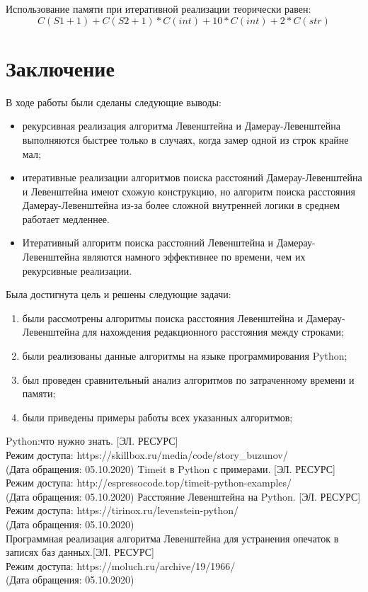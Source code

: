 \documentclass[a4paper]{article}
\begin{document}
	Использование памяти при итеративной реализации теорически равен:
	\begin{equation}
		C(S1+1) + C(S2+1) * C(int) + 10*C(int) + 2*C(str)
		\label{pamyat2}
	\end{equation}
	\clearpage
	\section*{Заключение} В ходе работы были сделаны следующие выводы:
	\begin{itemize}
		\item рекурсивная реализация алгоритма Левенштейна и Дамерау-Левенштейна выполняются быстрее только в случаях, когда замер одной из строк крайне мал;
		\item  итеративные реализации алгоритмов поиска расстояний Дамерау-Левенштейна и Левенштейна имеют схожую конструкцию, но алгоритм поиска расстояния Дамерау-Левенштейна из-за более сложной внутренней логики в среднем работает медленнее. 
		\item Итеративный алгоритм поиска расстояний Левенштейна и Дамерау-Левенштейна являются намного эффективнее по времени, чем их рекурсивные реализации.
	\end{itemize}
	Была достигнута цель и решены следующие задачи:
	\begin{enumerate}
		\item были рассмотрены алгоритмы поиска расстояния Левенштейна и Дамерау-Левенштейна для нахождения редакционного расстояния между строками;
		\item были реализованы данные алгоритмы на языке программирования Python;
		\item был проведен сравнительный анализ алгоритмов по затраченному времени и памяти;
		\item были приведены примеры работы всех указанных алгоритмов;
	\end{enumerate}
	\clearpage
	
	
	
	\begin{thebibliography}{4}
		Python:что нужно знать. [ЭЛ. РЕСУРС]\\
		Режим доступа: https://skillbox.ru/media/code/story\_buzunov/ \\
		(Дата обращения: 05.10.2020)
		Timeit в Python с примерами. [ЭЛ. РЕСУРС]\\
		Режим доступа: http://espressocode.top/timeit-python-examples/ \\
		(Дата обращения: 05.10.2020)
		Расстояние Левенштейна на Python. [ЭЛ. РЕСУРС] \\
		Режим доступа: https://tirinox.ru/levenstein-python/ \\
		(Дата обращения: 05.10.2020)\\
		Программная реализация алгоритма Левенштейна для устранения опечаток в записях баз данных.[ЭЛ. РЕСУРС]\\
		 Режим доступа: https://moluch.ru/archive/19/1966/ \\
		 (Дата обращения: 05.10.2020)
		 
	\end{thebibliography}
\end{document}
